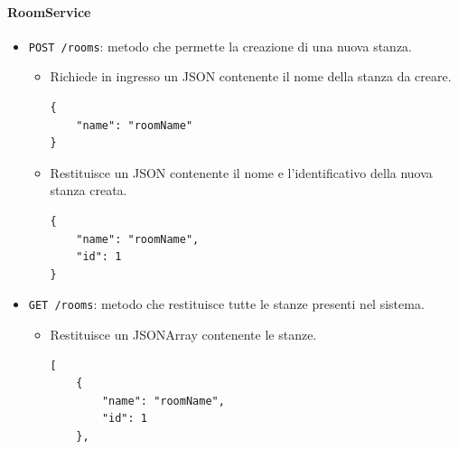 \documentclass[a4paper]{article}
\begin{document}
\paragraph{RoomService}
\begin{itemize}
    \item \texttt{POST /rooms}: metodo che permette la creazione di una nuova stanza.
    \begin{itemize}
        \item Richiede in ingresso un JSON contenente il nome della stanza da creare.
        \begin{verbatim}
{
    "name": "roomName"
}
        \end{verbatim}
        \item Restituisce un JSON contenente il nome e l'identificativo della nuova stanza creata.
        \begin{verbatim}
{
    "name": "roomName",
    "id": 1
}
        \end{verbatim}
    \end{itemize}
    \item \texttt{GET /rooms}: metodo che restituisce tutte le stanze presenti nel sistema.
    \begin{itemize}
        \item Restituisce un JSONArray contenente le stanze.
        \begin{verbatim}
[
    {
        "name": "roomName",
        "id": 1
    },
    

\end{verbatim}
\end{itemize}
\end{itemize}
\end{document}
